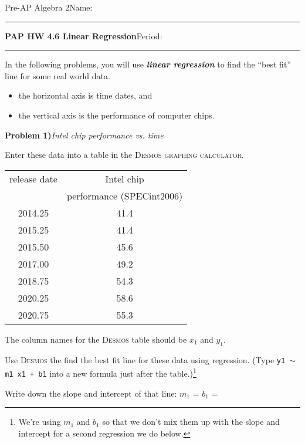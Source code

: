 \documentclass[10pt,letterpaper]{memoir}
\begin{document}
\pagestyle{plain}
\checkandfixthelayout
{}



{\small Pre-AP Algebra 2}\hfill Name: \rule{2in}{0.15mm}

{\bfseries\Large PAP HW 4.6 Linear Regression}\hfill Period: \rule{0.5in}{0.15mm}

In the following problems, 
you will use {\bfseries\itshape linear regression} to find the 
``best fit'' line for some real world data.
\begin{itemize}[noitemsep,parsep=0in]
    \item the horizontal axis is time {dates}, and
    \item the vertical axis is the performance of computer chips.
\end{itemize}


{\Large\bfseries Problem 1)}{\itshape Intel chip performance vs. time}

Enter these data into a table in the {\scshape Desmos graphing calculator}.
\begin{center}
    \begin{tabular}{cc}
        \toprule
            release date & Intel chip \\
            & performance (SPECint2006) \\
        \midrule
            2014.25 & 41.4 \\
            2015.25 & 41.4 \\
            2015.50 & 45.6 \\
            2017.00 & 49.2 \\
            2018.75 & 54.3 \\
            2020.25 & 58.6 \\
            2020.75 & 55.3 \\
        \bottomrule
    \end{tabular}
\end{center}
The column names for the {\scshape Desmos} table should be $x_1$ and $y_1$.

Use {\scshape Desmos} the find the best fit line for these data using regression.
(Type \texttt{y1 $\sim$ m1 x1 + b1} into a new formula just after the table.)\footnote{
    We're using $m_1$ and $b_1$ so that we don't mix them up with the slope and intercept 
    for a second regression we do below.
}

Write down the slope and intercept of that line:\quad 
$m_1$ = \gap{\phantom{99.999}}\qquad$b_1$ = \gap{\phantom{99.999}}
\end{document}

